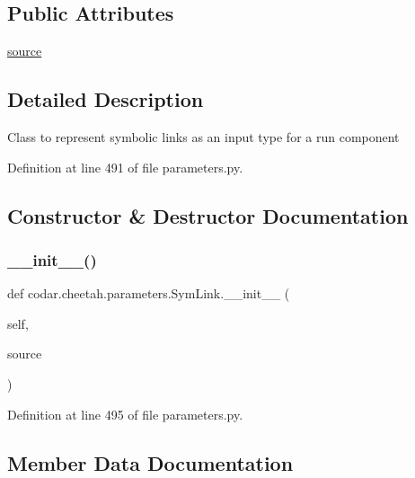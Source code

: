 \subsection*{Public Attributes}
\begin{DoxyCompactItemize}
\item 
\hyperlink{classcodar_1_1cheetah_1_1parameters_1_1_sym_link_a44311787db039f8d36a5f649f2aaba5e}{source}
\end{DoxyCompactItemize}


\subsection{Detailed Description}
\begin{DoxyVerb}Class to represent symbolic links as an input type for a run component
\end{DoxyVerb}
 

Definition at line 491 of file parameters.\+py.



\subsection{Constructor \& Destructor Documentation}
\mbox{\label{classcodar_1_1cheetah_1_1parameters_1_1_sym_link_a5be8b2828b71e39b667a275b1668bc58}} 
\subsubsection{\texorpdfstring{\+\_\+\+\_\+init\+\_\+\+\_\+()}{\_\_init\_\_()}}
{\footnotesize\ttfamily def codar.\+cheetah.\+parameters.\+Sym\+Link.\+\_\+\+\_\+init\+\_\+\+\_\+ (\begin{DoxyParamCaption}\item[{}]{self,  }\item[{}]{source }\end{DoxyParamCaption})}



Definition at line 495 of file parameters.\+py.



\subsection{Member Data Documentation}
\mbox{\label{classcodar_1_1cheetah_1_1parameters_1_1_sym_link_a44311787db039f8d36a5f649f2aaba5e}} 
